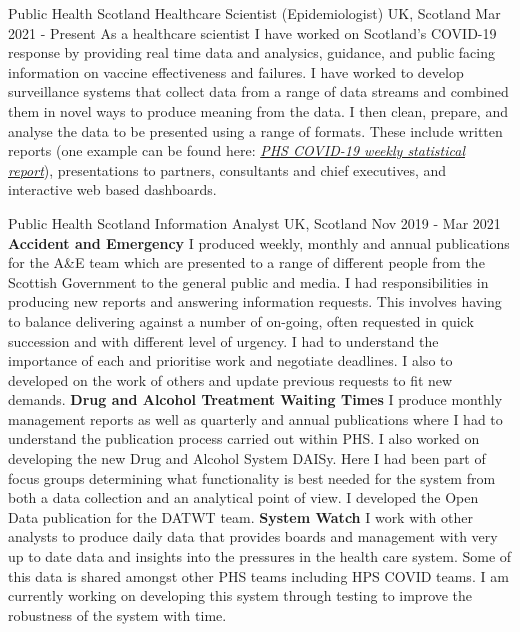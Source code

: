 


\begin{cventries}
 \cventry
{Public Health Scotland} %
{Healthcare Scientist (Epidemiologist)} %
{UK, Scotland} %
{Mar 2021 - Present} %
{
  As a healthcare scientist I have worked on Scotland's COVID-19 response by providing real time data and analysics, guidance, and public facing information on vaccine effectiveness and failures.\newline
  I have worked to develop surveillance systems that collect data from a range of data streams and combined them in novel ways to produce meaning from the data. I then clean, prepare, and analyse the data to be presented using a range of formats. These include written reports (one example can be found here: \href{https://publichealthscotland.scot/publications/covid-19-statistical-report/}{\textit{PHS COVID-19 weekly statistical report}}), presentations to partners, consultants and chief executives, and interactive web based dashboards.
}

\cventry
{Public Health Scotland}
{Information Analyst}
{UK, Scotland}
{Nov 2019 - Mar 2021}
{
            \textbf{Accident and Emergency}\newline
        I produced weekly, monthly and annual publications for the A\&E team which are presented to a range of different people from the Scottish Government to the general public and media. I had responsibilities in producing new reports and answering information requests. This involves having to balance delivering against a number of on-going, often requested in quick succession and with different level of urgency. I had to understand the importance of each and prioritise work and negotiate deadlines. I also to developed on the work of others and update previous requests to fit new demands.\newline
        \textbf{Drug and Alcohol Treatment Waiting Times}\newline
        I produce monthly management reports as well as quarterly and annual publications where I had to understand the publication process carried out within PHS. I also worked on developing the new Drug and Alcohol System DAISy. Here I had been part of focus groups determining what functionality is best needed for the system from both a data collection and an analytical point of view. I developed the Open Data publication for the DATWT team.\newline
        \textbf{System Watch}\newline
        I work with other analysts to produce daily data that provides boards and management with very up to date data and insights into the pressures in the health care system. Some of this data is shared amongst other PHS teams including HPS COVID teams. I am currently working on developing this system through testing to improve the robustness of the system with time.\newline
}


\end{cventries}
